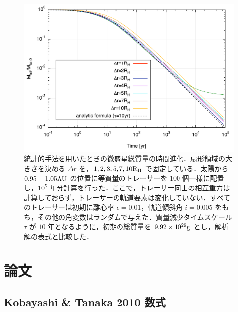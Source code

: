 \documentclass[11pt,a4paper,oneside,onecolumn]{jreport}
\begin{document}
\begin{figure}[H]
 \centering
 \includegraphics[width=12cm]{./image/MassDepletion_NoInteraction_2_100kyr.pdf}
 \caption{統計的手法を用いたときの微惑星総質量の時間進化．扇形領域の大きさを決める $\Delta r$ を，$1,2,3,5,7,10 {\rm R_H}$ で固定している．太陽から $0.95 - 1.05 {\rm AU}$ の位置に等質量のトレーサーを $100$ 個一様に配置し，$10^5$ 年分計算を行った．ここで，トレーサー同士の相互重力は計算しておらず，トレーサーの軌道要素は変化していない．すべてのトレーサーは初期に離心率 $e = 0.01$，軌道傾斜角 $i = 0.005$ をもち，その他の角変数はランダムで与えた．質量減少タイムスケール $\tau$ が $10$ 年となるように，初期の総質量を $9.92 \times 10^{29} {\rm g}$ とし，解析解の表式\cite{3}と比較した．\label{}}
\end{figure}



\appendix
\chapter{論文}

\section{Kobayashi \& Tanaka 2010 数式}
\end{document}
